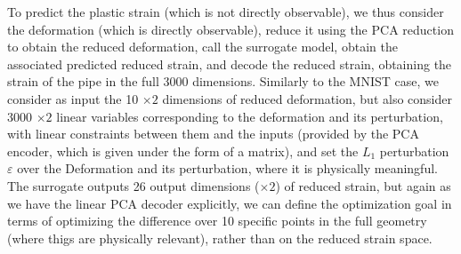 To predict the plastic strain (which is not directly observable), we thus consider the deformation (which is directly observable), reduce it using the PCA reduction to obtain the reduced deformation, call the surrogate model, obtain the associated predicted reduced strain, and decode the reduced strain, obtaining the strain of the pipe in the full 3000 dimensions. Similarly to the MNIST case, we consider as input the 10 $\times 2$ dimensions of reduced deformation, but also consider 3000 $\times 2$ linear variables corresponding to the deformation and its perturbation, with linear constraints between them and the inputs (provided by the PCA encoder, which is given under the form of a matrix), and set the $L_1$ perturbation $\varepsilon$ over the Deformation and its perturbation, where it is physically meaningful.
The surrogate outputs 26 output dimensions ($\times 2$) of reduced strain, but again 
as we have the linear PCA decoder explicitly, we can define the optimization goal 
in terms of optimizing the difference over 10 specific points in the full geometry (where thigs are physically relevant), rather than on the reduced strain space.

\newpage


